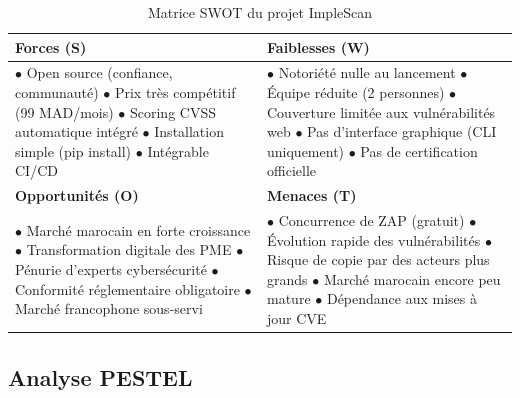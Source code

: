 \documentclass[12pt,a4paper]{report}
\begin{document}
\begin{table}[H]
\centering
\caption{Matrice SWOT du projet ImpleScan}
\begin{tabular}{|p{6cm}|p{6cm}|}
\hline
\cellcolor{gray!12}\textbf{Forces (S)} & \cellcolor{gray!12}\textbf{Faiblesses (W)} \\
\hline
$\bullet$ Open source (confiance, communauté)\newline
$\bullet$ Prix très compétitif (99 MAD/mois)\newline
$\bullet$ Scoring CVSS automatique intégré\newline
$\bullet$ Installation simple (pip install)\newline
$\bullet$ Intégrable CI/CD
&
$\bullet$ Notoriété nulle au lancement\newline
$\bullet$ Équipe réduite (2 personnes)\newline
$\bullet$ Couverture limitée aux vulnérabilités web\newline
$\bullet$ Pas d'interface graphique (CLI uniquement)\newline
$\bullet$ Pas de certification officielle \\
\hline
\cellcolor{gray!12}\textbf{Opportunités (O)} & \cellcolor{gray!12}\textbf{Menaces (T)} \\
\hline
$\bullet$ Marché marocain en forte croissance\newline
$\bullet$ Transformation digitale des PME\newline
$\bullet$ Pénurie d'experts cybersécurité\newline
$\bullet$ Conformité réglementaire obligatoire\newline
$\bullet$ Marché francophone sous-servi
&
$\bullet$ Concurrence de ZAP (gratuit)\newline
$\bullet$ Évolution rapide des vulnérabilités\newline
$\bullet$ Risque de copie par des acteurs plus grands\newline
$\bullet$ Marché marocain encore peu mature\newline
$\bullet$ Dépendance aux mises à jour CVE \\
\hline
\end{tabular}
\end{table}

\subsection{Analyse PESTEL}
\end{document}
